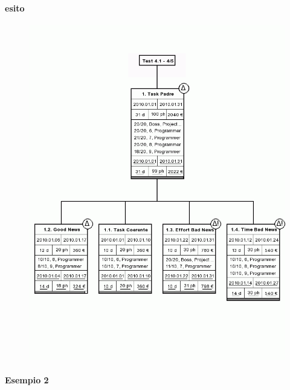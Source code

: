 \paragraph{esito}
\begin{figure}
\centering
\includegraphics[width=\textwidth]{tests/TEST_WBS/4.1/4.1_4_5/Esempio_1/output.png}
\end{figure}

\paragraph{Esempio 2}
